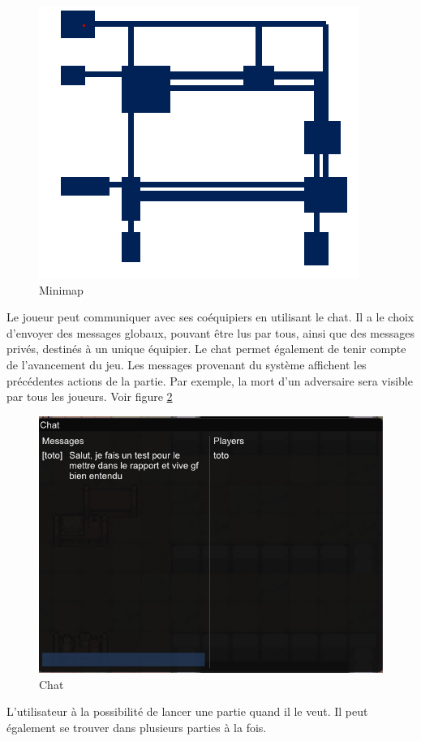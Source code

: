 \documentclass[a4paper, 12pt, twoside]{article}
\begin{document}
\begin{figure}[H]
    \center
	\includegraphics[scale=1]{Mini-Map}
	\caption{Minimap}
	\label{minimap}
\end{figure}
Le joueur peut communiquer avec ses coéquipiers en utilisant le chat. Il a le choix d'envoyer des messages globaux, pouvant être lus par tous, ainsi que des messages privés, destinés à un unique équipier. Le chat permet également de tenir compte de l'avancement du jeu. Les messages provenant du système affichent les précédentes actions de la partie. Par exemple, la mort d'un adversaire sera visible par tous les joueurs. Voir figure \ref{chat}\\\par
\begin{figure}[H]
    \center
    \includegraphics[scale=0.5]{Chat}
    \caption{Chat}
    \label{chat}
\end{figure}    
L'utilisateur à la possibilité de lancer une partie quand il le veut. Il peut également se trouver dans plusieurs parties à la fois.
\newpage
\end{document}
